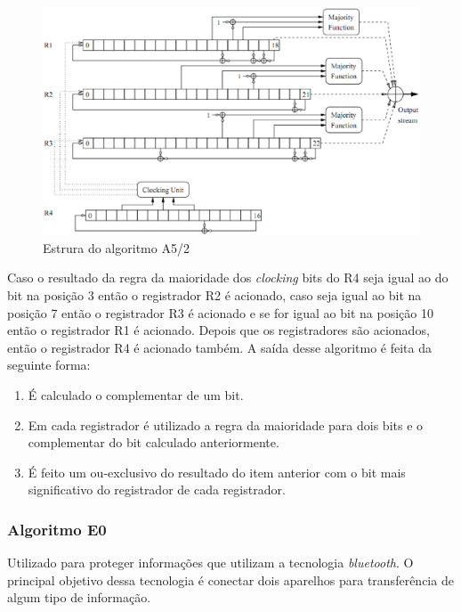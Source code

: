 \begin{figure}[h]
\centering
\includegraphics[keepaspectratio=true,scale=0.5]
    {figuras/a5_2.eps}
    \caption[Estrura do algoritmo A5/2]{Estrura do algoritmo A5/2\protect\footnotemark } 
\end{figure}

Caso o resultado da regra da maioridade dos \textit{clocking} bits do R4 seja igual ao do bit na posição 3 então o registrador R2 é acionado, caso seja igual ao bit na posição 7 então o registrador R3 é acionado e se for igual ao bit na posição 10 então o registrador R1 é acionado. Depois que os registradores são acionados, então o registrador R4 é acionado também. A saída desse algoritmo é feita da seguinte forma:

\begin{enumerate}
	\item É calculado o complementar de um bit.
	\item Em cada registrador é utilizado a regra da maioridade para dois bits e o complementar do bit calculado anteriormente. 
	\item É feito um ou-exclusivo do resultado do item anterior com o bit mais significativo do registrador de cada registrador.
\end{enumerate}

\subsubsection{Algoritmo E0}
\label{algorithm-e0}

Utilizado para proteger informações que utilizam a tecnologia \textit{bluetooth}. O principal objetivo dessa tecnologia é conectar dois aparelhos para transferência de algum tipo de informação.

